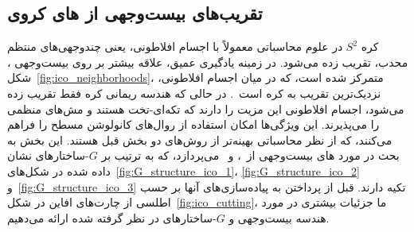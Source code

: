 

\subsection{تقریب‌های بیست‌وجهی از های کروی}
\label{sec:spherical_CNNs_icosahedral}

کره $S^2$ در علوم محاسباتی معمولاً با اجسام افلاطونی، یعنی چندوجهی‌های منتظم محدب، تقریب زده می‌شود.
در زمینه یادگیری عمیق، علاقه بیشتر بر روی بیست‌وجهی  ، شکل~\ref{fig:ico_neighborhoods}، متمرکز شده است، که در میان اجسام افلاطونی، نزدیک‌ترین تقریب به کره است~\cite{schroder1995spherical}.
در حالی که هندسه ریمانی کره فقط تقریب زده می‌شود، اجسام افلاطونی این مزیت را دارند که تکه‌ای-تخت هستند و مش‌های منظمی را می‌پذیرند.
این ویژگی‌ها امکان استفاده از روال‌های کانولوشن مسطح را فراهم می‌کنند، که از نظر محاسباتی بهینه‌تر از روش‌های دو بخش قبل هستند.
این بخش به بحث در مورد های بیست‌وجهی از~\cite{liu2018icoAltAz}، \cite{zhang2019orientation} و~\cite{gaugeIco2019} می‌پردازد، که به ترتیب بر $G$-ساختارهای نشان داده شده در شکل‌های~\ref{fig:G_structure_ico_1}، \ref{fig:G_structure_ico_2} و~\ref{fig:G_structure_ico_3} تکیه دارند.
قبل از پرداختن به پیاده‌سازی‌های آنها بر حسب اطلسی از چارت‌های افاین در شکل~\ref{fig:ico_cutting}،
ما جزئیات بیشتری در مورد هندسه بیست‌وجهی و $G$-ساختارهای در نظر گرفته شده ارائه می‌دهیم.


